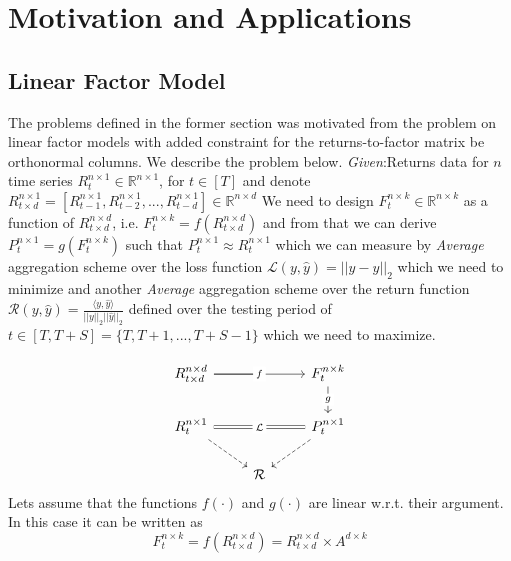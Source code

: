 \section{Motivation and Applications}

\subsection{Linear Factor Model}
The problems defined in the former section was motivated from the problem on linear factor models with added constraint for the returns-to-factor matrix be orthonormal columns. We describe the problem below.\newline
\textit{Given}:\newline Returns data for $n$ time series $R^{n\times 1}_t \in \mathbb{R}^{n\times 1}$, for $t\in [T]$ \newline
and denote $R^{n\times 1}_{t\times d} = [R^{n\times 1}_{t-1},R^{n\times 1}_{t-2},...,R^{n\times 1}_{t-d}] \in \mathbb{R}^{n\times d}$\newline
We need to design $F^{n\times k}_t \in \mathbb{R}^{n\times k}$ as a function of $R^{n\times d}_{t\times d}$, i.e. $F^{n\times k}_t = f(R^{n\times d}_{t\times d})$ and from that we can derive $P^{n \times 1}_{t} = g(F^{n\times k}_t)$ such that $P^{n \times 1}_{t} \approx R^{n \times 1}_{t}$ which we can measure by \textit{Average} aggregation scheme over the loss function $\mathcal{L}(y,\hat{y}) = ||y-\hat{y}||_2$ which we need to minimize and another \textit{Average} aggregation scheme over the return function $\mathcal{R}(y,\hat{y}) = \frac{\langle y,\hat{y}\rangle}{||y||_2||\hat{y}||_2}$ defined over the testing period of $t \in [T,T+S]= \{T,T+1,...,T+S-1\}$ which we need to maximize.

\begin{equation} \label{lfm_diagram}
\begin{tikzcd}
R^{n\times d}_{t \times d} \arrow[rr, "f" description] \arrow[r, no head]& {}& F^{n\times k}_{t} \arrow[d, "g" description] \\
R^{n\times 1}_t \arrow[rr, "\mathcal{L}" description, Rightarrow, no head] \arrow[rd, dashed] && P^{n \times 1}_{t} \arrow[ld, dashed]\\
& \mathcal{R} &
\end{tikzcd}
\end{equation}
\newline
Lets assume that the functions $f(\cdot)$ and $g(\cdot)$ are linear w.r.t. their argument. In this case it can be written as
\begin{equation} \label{f_for_lfm}
F^{n\times k}_t = f(R^{n\times d}_{t\times d}) = R^{n\times d}_{t\times d}\times A^{d\times k}
\end{equation}

